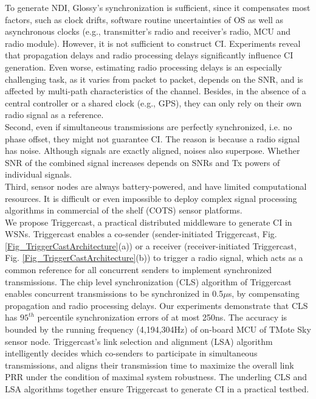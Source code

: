 \documentclass[conference]{IEEEtran}
\begin{document}
To generate NDI, Glossy's synchronization is sufficient, since it compensates most factors, such as clock drifts, software routine uncertainties of OS as well as asynchronous clocks (e.g., transmitter's radio and receiver's radio, MCU and radio module).
However, it is not sufficient to construct CI.
Experiments reveal that propagation delays and radio processing delays significantly influence CI generation.
Even worse, estimating radio processing delays is an especially challenging task, as it varies from packet to packet, depends on the SNR, and is affected by multi-path characteristics of the channel.
Besides, in the absence of a central controller or a shared clock (e.g., GPS), they can only rely on their own radio signal as a reference.\\
\indent Second, even if simultaneous transmissions are perfectly synchronized, i.e. no phase offset, they might not guarantee CI. The reason is because a radio signal has noise. Although signals are exactly aligned, noises also superpose. Whether SNR of the combined signal increases depends on SNRs and Tx powers of individual signals.\\
\indent Third, sensor nodes are always battery-powered, and have limited computational resources. It is difficult or even impossible to deploy complex signal processing algorithms in commercial of the shelf (COTS) sensor platforms.\\
\indent We propose Triggercast, a practical distributed middleware to generate CI in WSNs.
Triggercast enables a co-sender (sender-initiated Triggercast, Fig. \ref{Fig_TriggerCastArchitecture}(a)) or a receiver (receiver-initiated Triggercast, Fig. \ref{Fig_TriggerCastArchitecture}(b)) to trigger a radio signal, which acts as a common reference for all concurrent senders to implement synchronized transmissions.
The chip level synchronization (CLS) algorithm of Triggercast enables concurrent transmissions to be synchronized in 0.5$\mu$s, by compensating propagation and radio processing delays.
Our experiments demonstrate that CLS has $95^{th}$ percentile synchronization errors of at most 250ns.
The accuracy is bounded by the running frequency (4,194,304Hz) of on-board MCU of TMote Sky sensor node.
Triggercast's link selection and alignment (LSA) algorithm intelligently decides which co-senders to participate in simultaneous
transmissions, and aligns their transmission time to maximize the overall link PRR under the condition of maximal system robustness.
The underling CLS and LSA algorithms together ensure Triggercast to generate CI in a practical testbed.
\end{document}

